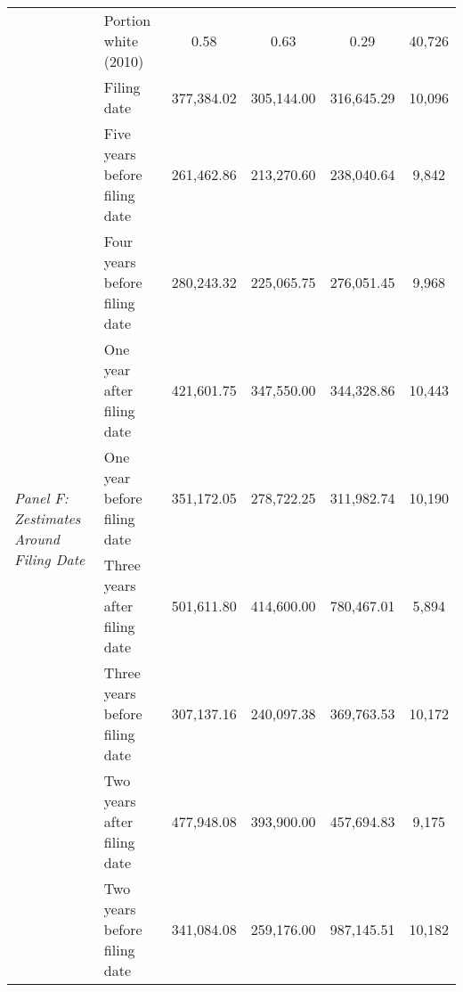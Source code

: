 \begin{tabular}{llcccc}
 & Portion white (2010) & 0.58 & 0.63 & 0.29 & 40,726 \\
\cline{1-6}
\multirow[c]{9}{3cm}{\textit{Panel F: Zestimates Around Filing Date}} & Filing date & 377,384.02 & 305,144.00 & 316,645.29 & 10,096 \\
 & Five years before filing date & 261,462.86 & 213,270.60 & 238,040.64 & 9,842 \\
 & Four years before filing date & 280,243.32 & 225,065.75 & 276,051.45 & 9,968 \\
 & One year after filing date & 421,601.75 & 347,550.00 & 344,328.86 & 10,443 \\
 & One year before filing date & 351,172.05 & 278,722.25 & 311,982.74 & 10,190 \\
 & Three years after filing date & 501,611.80 & 414,600.00 & 780,467.01 & 5,894 \\
 & Three years before filing date & 307,137.16 & 240,097.38 & 369,763.53 & 10,172 \\
 & Two years after filing date & 477,948.08 & 393,900.00 & 457,694.83 & 9,175 \\
 & Two years before filing date & 341,084.08 & 259,176.00 & 987,145.51 & 10,182 \\
\cline{1-6}
\bottomrule
\end{tabular}
